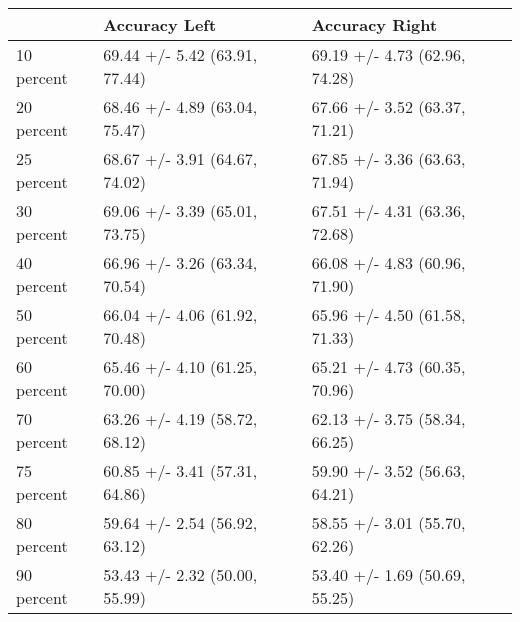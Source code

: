 \begin{tabular}{lll}
\toprule
{} &                  Accuracy Left &                 Accuracy Right \\
\midrule
10 percent &  69.44 +/- 5.42 (63.91, 77.44) &  69.19 +/- 4.73 (62.96, 74.28) \\
20 percent &  68.46 +/- 4.89 (63.04, 75.47) &  67.66 +/- 3.52 (63.37, 71.21) \\
25 percent &  68.67 +/- 3.91 (64.67, 74.02) &  67.85 +/- 3.36 (63.63, 71.94) \\
30 percent &  69.06 +/- 3.39 (65.01, 73.75) &  67.51 +/- 4.31 (63.36, 72.68) \\
40 percent &  66.96 +/- 3.26 (63.34, 70.54) &  66.08 +/- 4.83 (60.96, 71.90) \\
50 percent &  66.04 +/- 4.06 (61.92, 70.48) &  65.96 +/- 4.50 (61.58, 71.33) \\
60 percent &  65.46 +/- 4.10 (61.25, 70.00) &  65.21 +/- 4.73 (60.35, 70.96) \\
70 percent &  63.26 +/- 4.19 (58.72, 68.12) &  62.13 +/- 3.75 (58.34, 66.25) \\
75 percent &  60.85 +/- 3.41 (57.31, 64.86) &  59.90 +/- 3.52 (56.63, 64.21) \\
80 percent &  59.64 +/- 2.54 (56.92, 63.12) &  58.55 +/- 3.01 (55.70, 62.26) \\
90 percent &  53.43 +/- 2.32 (50.00, 55.99) &  53.40 +/- 1.69 (50.69, 55.25) \\
\bottomrule
\end{tabular}
